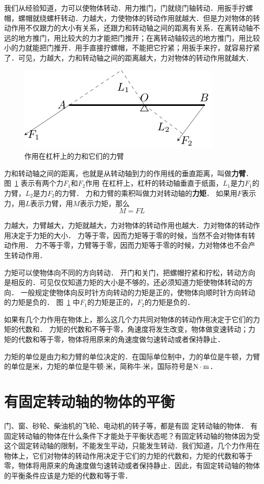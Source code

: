 我们从经验知道，力可以使物体转动．用力推门，门就绕门轴转动．用扳手拧螺帽，螺帽就绕螺杆转动．力越大，力使物体的转动作用就越大．但是力对物体的转动作用不仅跟力的大小有关系，还跟力和转动轴之间的距离有关系．在离转动轴不远的地方推门，用比较大的力才能把门推开；在离转动轴较远的地方推门，用比较小的力就能把门推开．用手直接拧螺帽，不能把它拧紧；用扳手来拧，就容易拧紧了．可见，力越大，力和转动轴之间的距离越大，力对物体的转动作用就越大．
\begin{figure}[htbp]
    \centering
    \includegraphics{fig/A/6-7.pdf}
    \caption{作用在杠杆上的力和它们的力臂}\label{fig_A_6-7}
\end{figure}

力和转动轴之间的距离，也就是从转动轴到力的作用线的垂直距离，叫做\textbf{力臂}．
图~\ref{fig_A_6-7} 表示有两个力$F_1$和$F_2$作用
在杠杆上，杠杆的转动轴垂直于纸面，$L_1$是力$F_1$的力臂，$L_2$是力$F_2$的力臂．
力和力臂的乘积叫做力对转动轴的\textbf{力矩}．
如果用$F$表示力，用$L$表示力臂，用$M$表示力矩，那么
\[M=FL\]


力越大，力臂越大，力矩就越大，力对物体的转动作用也越大．力对物体的转动作用决定于力矩的大小．
力等于零，因而力矩等于零的时候，当然不会对物体有转动作用．
力不等于零，力臂等于零，因而力矩等于零的时候，力对物体也不会产生转动作用．

力矩可以使物体向不同的方向转动．
开门和关门，把螺帽拧紧和拧松，转动方向是相反的．可见仅仅知道力矩的大小是不够的，还必须知道力矩使物体转动的方向．
一般规定使物体向反时针方向转动的力矩是正的，使物体向顺时针方向转动的力矩是负的．
图~\ref{fig_A_6-7} 中$F_1$的力矩是正的，$F_2$的力矩是负的．

如果有几个力作用在物体上，那么这几个力共同对物体的转动作用决定于它们的力矩的代数和．
力矩的代数和不等于零，角速度将发生改变，物体做变速转动；力矩的代数和等于零，物体将用原来的角速度做匀速转动或者保持静止．

力矩的单位是由力和力臂的单位决定的．在国际单位制中，力的单位是牛顿，力臂的单位是米，力矩的单位是牛顿$\cdot$米，简称牛$\cdot$米，国际符号是$\text{N}\cdot\text{m}$．

\section{有固定转动轴的物体的平衡}
门、窗、砂轮、柴油机的飞轮、电动机的转子等，都是有固
定转动轴的物体．
有固定转动轴的物体在什么条件下才能处于平衡状态呢？有固定转动轴的物体因为受这个固定转动轴的限制，不能发生平动，只能发生转动．我们知道，几个力作用在物体上，它们对物体的转动作用决定于它们的力矩的代数和，力矩的代数和等于零，物体将用原来的角速度做匀速转动或者保持静止．因此，有固定转动轴的物体的平衡条件应该是力矩的代数和等于零．

